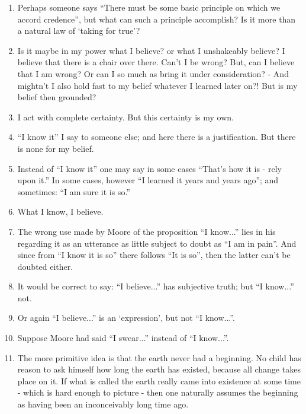 \documentclass{book}
\begin{document}
\begin{enumerate}
\item
Perhaps someone says ``There must be some basic principle on which we accord
credence'', but what can such a principle accomplish? Is it more than a natural
law of `taking for true'?

\item
Is it maybe in my power what I believe? or what I unshakeably believe?  I
believe that there is a chair over there. Can't I be wrong? But, can I believe
that I am wrong? Or can I so much as bring it under consideration? - And
mightn't I also hold fast to my belief whatever I learned later on?! But is my
belief then grounded?

\item
I act with complete certainty. But this certainty is my own.

\item
``I know it'' I say to someone else; and here there is a justification. But
there is none for my belief.

\item
Instead of ``I know it'' one may say in some cases ``That's how it is - rely
upon it.'' In some cases, however ``I learned it years and years ago''; and
sometimes: ``I am sure it is so.''

\item
What I know, I believe.

\item
The wrong use made by Moore of the proposition ``I know...'' lies in his
regarding it as an utterance as little subject to doubt as ``I am in pain''.
And since from ``I know it is so'' there follows ``It is so'', then the latter
can't be doubted either.

\item
It would be correct to say: ``I believe...'' has subjective truth; but ``I
know...'' not.

\item
Or again ``I believe...'' is an `expression', but not ``I know...''.

\item
Suppose Moore had said ``I swear...'' instead of ``I know...''.

\item
The more primitive idea is that the earth never had a beginning. No child has
reason to ask himself how long the earth has existed, because all change takes
place on it. If what is called the earth really came into existence at some
time - which is hard enough to picture - then one naturally assumes the
beginning as having been an inconceivably long time ago.


\end{enumerate}
\end{document}
